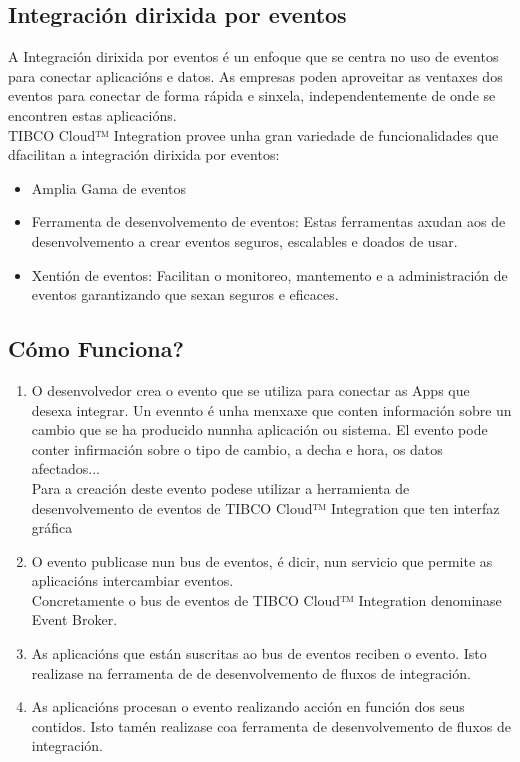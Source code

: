 \begin{flushleft}
\section{Integración dirixida por eventos}
A Integración dirixida por eventos é un enfoque que se centra no uso de eventos para conectar aplicacións e datos. As empresas poden aproveitar as ventaxes dos eventos para conectar de forma rápida e sinxela, independentemente de onde se encontren estas aplicacións. \\
TIBCO Cloud™ Integration provee unha gran variedade de funcionalidades que  dfacilitan a integración dirixida por eventos:\\
\begin{itemize}
    \item Amplia Gama de eventos
    \item Ferramenta de desenvolvemento de eventos: Estas ferramentas axudan aos de desenvolvemento a crear eventos seguros, escalables e doados de usar.
    \item Xentión de eventos: Facilitan o monitoreo, mantemento e a administración de eventos garantizando que sexan seguros e eficaces.
\end{itemize}
\subsection{Cómo Funciona?}
\begin{enumerate}
    \item O desenvolvedor crea o evento que se utiliza para conectar as Apps que desexa integrar. Un evennto é unha menxaxe que conten información sobre un cambio que se ha producido nunnha aplicación ou sistema. El evento pode conter infirmación sobre o tipo de cambio, a decha e hora, os datos afectados...\\
    Para a creación deste evento podese utilizar a herramienta de desenvolvemento de eventos de TIBCO Cloud™ Integration que ten interfaz gráfica
    \item O evento publicase nun bus de eventos, é dicir, nun servicio que permite as aplicacións intercambiar eventos.\\
    Concretamente o bus de eventos de TIBCO Cloud™ Integration denominase Event Broker.
    \item As aplicacións que están suscritas ao bus de eventos reciben o evento. Isto realizase na ferramenta de de desenvolvemento de fluxos de integración.
    \item As aplicacións procesan o evento realizando acción en función dos seus contidos. Isto tamén realizase coa ferramenta de desenvolvemento de fluxos de integración.
\end{enumerate}

\end{flushleft}
